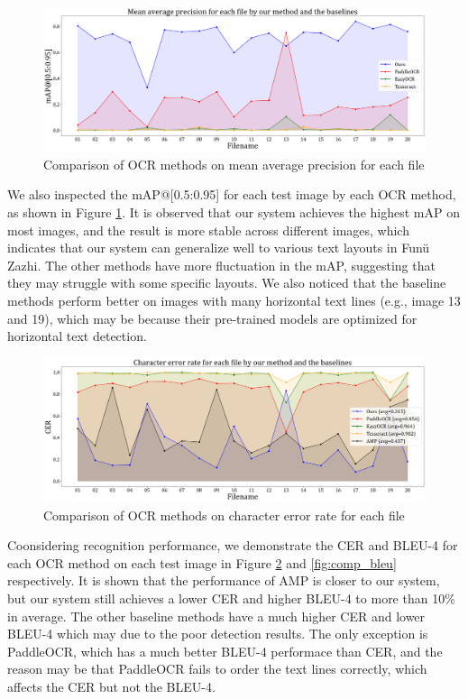 \documentclass[12pt,twoside]{report}
\begin{document}
\begin{figure}[htbp]
    \centering
    \includegraphics[width=\textwidth]{./figures/comp_map2.png}
    \caption{Comparison of OCR methods on mean average precision for each file}
    \label{fig:comp_map2}
\end{figure}

We also inspected the mAP@[0.5:0.95] for each test image by each OCR method, as shown in Figure \ref{fig:comp_map2}. It is observed that our system achieves the highest mAP on most images, and the result is more stable across different images, which indicates that our system can generalize well to various text layouts in Funü Zazhi. The other methods have more fluctuation in the mAP, suggesting that they may struggle with some specific layouts. We also noticed that the baseline methods perform better on images with many horizontal text lines (e.g., image 13 and 19), which may be because their pre-trained models are optimized for horizontal text detection.

\begin{figure}[htbp]
    \centering
    \includegraphics[width=\textwidth]{./figures/comp_cer.png}
    \caption{Comparison of OCR methods on character error rate for each file}
    \label{fig:comp_cer}
\end{figure}

Coonsidering recognition performance, we demonstrate the CER and BLEU-4 for each OCR method on each test image in Figure \ref{fig:comp_cer} and \ref{fig:comp_bleu} respectively. It is shown that the performance of AMP is closer to our system, but our system still achieves a lower CER and higher BLEU-4 to more than 10\% in average. The other baseline methods have a much higher CER and lower BLEU-4 which may due to the poor detection results. The only exception is PaddleOCR, which has a much better BLEU-4 performace than CER, and the reason may be that PaddleOCR fails to order the text lines correctly, which affects the CER but not the BLEU-4.
\end{document}
